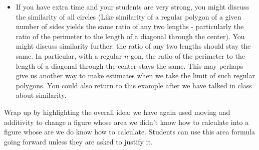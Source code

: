 \documentclass[nooutcomes,noauthor]{ximera}
\begin{document}
\begin{instructorNotes}
\begin{itemize}
\item If you have extra time and your students are very strong, you might discuss the similarity of all circles (Like similarity of a regular polygon of a given number of sides yields the same ratio of any two lengths - particularly the ratio of the perimeter to the length of a diagonal through the center).  You might discuss similarity further: the ratio of any two lengths should stay the same.  In particular, with a regular $n$-gon, the ratio of the perimeter to the length of a diagonal through the center stays the same.  This may perhaps give us another way to make estimates when we take the limit of such regular polygons. You could also return to this example after we have talked in class about similarity.
\end{itemize}

Wrap up by highlighting the overall idea: we have again used moving and additivity to change a figure whose area we didn't know how to calculate into a figure whose are we do know how to calculate. Students can use this area formula going forward unless they are asked to justify it.



\end{instructorNotes}
\end{document}
